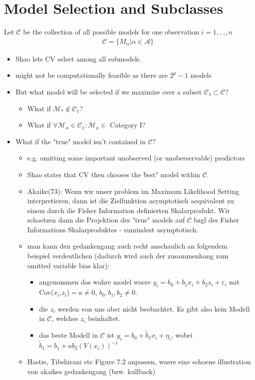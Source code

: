 \documentclass[Research_Module_ES.tex]{subfiles}
\begin{document}
\section{Model Selection and Subclasses}
Let $\mathcal{C}$ be the collection of all possible models for one observation $i=1,...,n$
\begin{align*}
	\mathcal{C}=\{M_\alpha|\alpha\in\mathcal{A}\}
\end{align*}

\begin{itemize}
\item Shao lets CV select among all submodels.
\item might not be computationally feasible as there are $2^p-1$ models
\item But what model will be selected if we maximize over a subset $\mathcal{C}_1\subset\mathcal{C}$?
\begin{itemize}
\item What if $\mathcal{M}_\ast \not\in \mathcal{C}_1$?
\item What if $\forall \mathcal{M}_\alpha \in \mathcal{C}_1 : \mathcal{M}_\alpha\in$ Category I?
\end{itemize}
\item What if the "true" model isn't contained in $\mathcal{C}$?
\begin{itemize}
\item e.g. omitting some important unobserved (or unoberservable) predictors
\item Shao states that CV then chooses the \" best" model within $\mathcal{C}$.
\item Akaike(73): Wenn wir unser problem im Maximum Likelihood Setting interpretieren, dann ist die Zielfunktion asymptotisch aequivalent zu einem durch die Fisher Information definierten Skalarprodukt. Wir schaetzen dann die Projektion des "true" models auf $\mathcal{C}$ bzgl des Fisher Informations Skalarproduktes - zumindest asymptotisch.
\item man kann den gedankengang auch recht anschaulich an folgendem beispiel verdeutlichen (dadurch wird auch der zusammenhang zum omitted variable bias klar):
\begin{itemize}
\item angenommen das wahre model waere $y_i = b_0 + b_1 x_i + b_2 z_i + \varepsilon_i$ mit Cov($x_i$,$z_i$)$=a\neq 0$, $b_0,b_1,b_2\neq 0$.
\item die $z_i$ werden von uns aber nicht beobachtet. Es gibt also kein Modell in $\mathcal{C}$, welches $z_i$ beinhaltet.
\item das beste Modell in $\mathcal{C}$ ist $y_i=b_0+\tilde{b}_1 x_i + \eta_i$, wobei $\tilde{b}_1=b_1+ab_2 (V(x_i))^{-1}$
\end{itemize}
\item Hastie, Tibshirani etc Figure 7.2 anpassen, waere eine schoene illustration von akaikes gedankengang (bzw. kullback)
\end{itemize}
\end{itemize}
\end{document}
